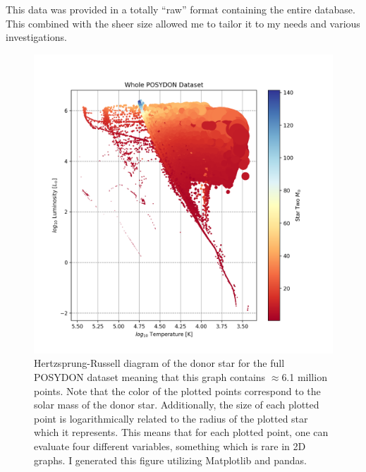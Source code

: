 \documentclass[12pt, a4paper]{article}
\begin{document}
    This data was provided in a totally ``raw'' format containing the entire database. This combined with the sheer size allowed me to tailor it to my needs and various investigations.  

    \begin{figure} [H]
        \centering
        \includegraphics[scale = .5]{figs/GeneratedFigs/WholePOSYDONDatasetExample.png}
        \caption{Hertzsprung-Russell diagram of the donor star for the full POSYDON dataset meaning that this graph contains $\approx$6.1 million points. Note that the color of the plotted points correspond to the solar mass of the donor star. Additionally, the size of each plotted point is logarithmically related to the radius of the plotted star which it represents. This means that for each plotted point, one can evaluate four different variables, something which is rare in 2D graphs. I generated this figure utilizing Matplotlib and pandas.}
        \label{EntireDataSetHR}
    \end{figure}
\end{document}
